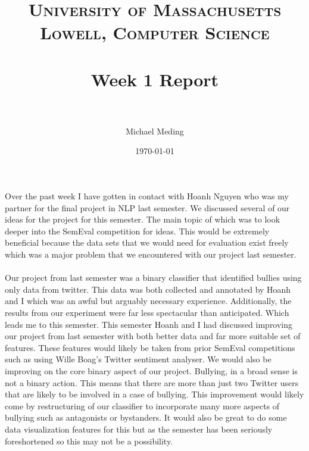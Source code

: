 \documentclass[paper=a4, fontsize=11pt]{scrartcl} %
\title{	
\normalfont \normalsize 
\textsc{University of Massachusetts Lowell, Computer Science} \\ [25pt] %
\horrule{0.5pt} \\[0.4cm] %
\huge Week 1 Report \\ %
\horrule{2pt} \\[0.5cm] %
}
\author{Michael Meding} %
\date{\normalsize\today} %
\numberwithin{equation}{section} %
\numberwithin{figure}{section} %
\numberwithin{table}{section} %
\begin{document}
\maketitle %


\paragraph{}
Over the past week I have gotten in contact with Hoanh Nguyen who was my partner for the final project in NLP last semester. We discussed several of our ideas for the project for this semester. The main topic of which was to look deeper into the SemEval competition for ideas. This would be extremely beneficial because the data sets that we would need for evaluation exist freely which was a major problem that we encountered with our project last semester. 
\paragraph{}
Our project from last semester was a binary classifier that identified bullies using only data from twitter. This data was both collected and annotated by Hoanh and I which was an awful but arguably necessary experience. Additionally, the results from our experiment were far less spectacular than anticipated. Which leads me to this semester. This semester Hoanh and I had discussed improving our project from last semester with both better data and far more suitable set of features. These features would likely be taken from prior SemEval competitions such as using Wille Boag's Twitter sentiment analyser. We would also be improving on the core binary aspect of our project. Bullying, in a broad sense is not a binary action. This means that there are more than just two Twitter users that are likely to be involved in a case of bullying. This improvement would likely come by restructuring of our classifier to incorporate many more aspects of bullying such as antagonists or bystanders. It would also be great to do some data visualization features for this but as the semester has been seriously foreshortened so this may not be a possibility.
\end{document}
